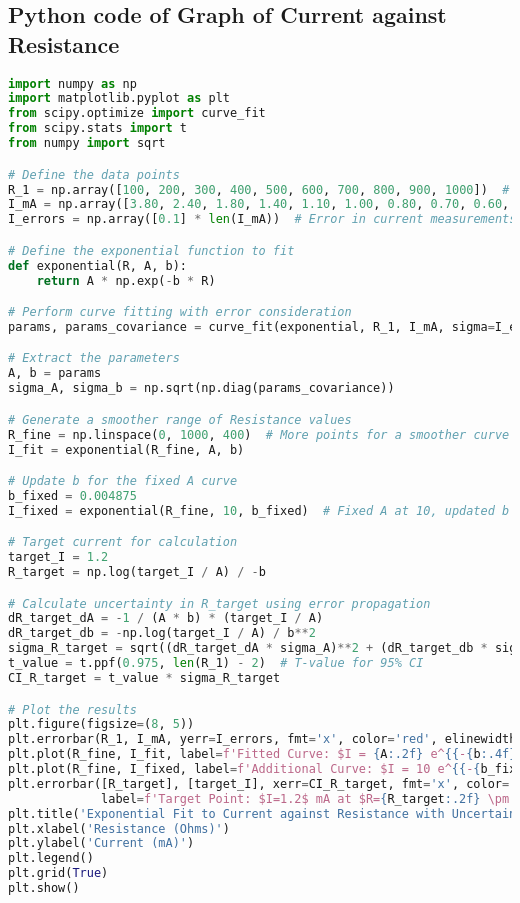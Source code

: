 \documentclass[twocolumn,a4paper,11pt]{article}
\begin{document}
\subsection*{Python code of Graph of Current against Resistance}
\begin{lstlisting}[language=Python]
import numpy as np
import matplotlib.pyplot as plt
from scipy.optimize import curve_fit
from scipy.stats import t
from numpy import sqrt

# Define the data points
R_1 = np.array([100, 200, 300, 400, 500, 600, 700, 800, 900, 1000])  # Resistance in ohms
I_mA = np.array([3.80, 2.40, 1.80, 1.40, 1.10, 1.00, 0.80, 0.70, 0.60, 0.50])  # Current in milliamps
I_errors = np.array([0.1] * len(I_mA))  # Error in current measurements

# Define the exponential function to fit
def exponential(R, A, b):
    return A * np.exp(-b * R)

# Perform curve fitting with error consideration
params, params_covariance = curve_fit(exponential, R_1, I_mA, sigma=I_errors, absolute_sigma=True, p0=[10, 0.001])

# Extract the parameters
A, b = params
sigma_A, sigma_b = np.sqrt(np.diag(params_covariance))

# Generate a smoother range of Resistance values
R_fine = np.linspace(0, 1000, 400)  # More points for a smoother curve
I_fit = exponential(R_fine, A, b)

# Update b for the fixed A curve
b_fixed = 0.004875
I_fixed = exponential(R_fine, 10, b_fixed)  # Fixed A at 10, updated b

# Target current for calculation
target_I = 1.2
R_target = np.log(target_I / A) / -b

# Calculate uncertainty in R_target using error propagation
dR_target_dA = -1 / (A * b) * (target_I / A)
dR_target_db = -np.log(target_I / A) / b**2
sigma_R_target = sqrt((dR_target_dA * sigma_A)**2 + (dR_target_db * sigma_b)**2)
t_value = t.ppf(0.975, len(R_1) - 2)  # T-value for 95% CI
CI_R_target = t_value * sigma_R_target

# Plot the results
plt.figure(figsize=(8, 5))
plt.errorbar(R_1, I_mA, yerr=I_errors, fmt='x', color='red', elinewidth=2, capsize=4, label='Data Points with Error Bars')
plt.plot(R_fine, I_fit, label=f'Fitted Curve: $I = {A:.2f} e^{{-{b:.4f}R}}$', color='blue')
plt.plot(R_fine, I_fixed, label=f'Additional Curve: $I = 10 e^{{-{b_fixed:.4f}R}}$', color='green', linestyle='--')
plt.errorbar([R_target], [target_I], xerr=CI_R_target, fmt='x', color='black', elinewidth=2, capsize=4,
             label=f'Target Point: $I=1.2$ mA at $R={R_target:.2f} \pm {CI_R_target:.2f}$ Ohms')
plt.title('Exponential Fit to Current against Resistance with Uncertainty')
plt.xlabel('Resistance (Ohms)')
plt.ylabel('Current (mA)')
plt.legend()
plt.grid(True)
plt.show()
\end{lstlisting}
\end{document}
